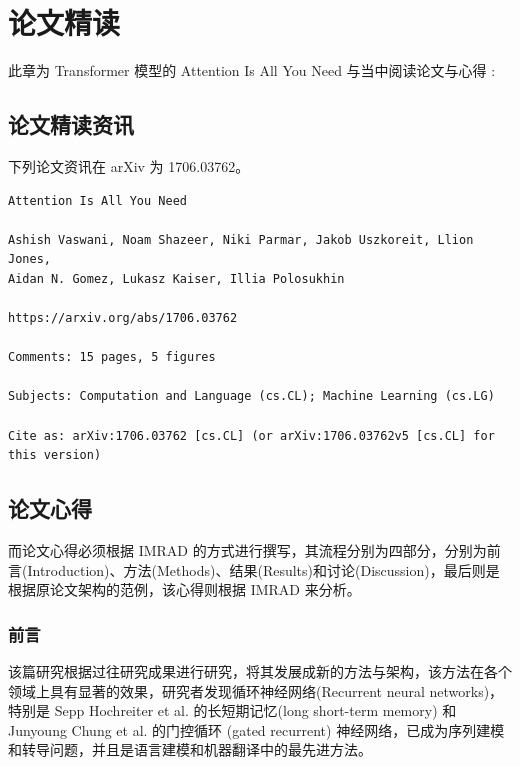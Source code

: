 \chapter{论文精读}
\label{chap:2}

此章为 Transformer 模型的 Attention Is All You Need \cite{vaswani2017attention} 与当中阅读论文与心得 :

\section{论文精读资讯}

下列论文资讯在 arXiv 为 1706.03762。

\begin{Verbatim}
Attention Is All You Need

Ashish Vaswani, Noam Shazeer, Niki Parmar, Jakob Uszkoreit, Llion Jones, 
Aidan N. Gomez, Lukasz Kaiser, Illia Polosukhin

https://arxiv.org/abs/1706.03762

Comments: 15 pages, 5 figures

Subjects: Computation and Language (cs.CL); Machine Learning (cs.LG)

Cite as: arXiv:1706.03762 [cs.CL] (or arXiv:1706.03762v5 [cs.CL] for this version)
\end{Verbatim}

\section{论文心得}

而论文心得必须根据 IMRAD 的方式进行撰写，其流程分别为四部分，分别为前言(Introduction)、方法(Methods)、结果(Results)和讨论(Discussion)，最后则是根据原论文架构的范例，该心得则根据 IMRAD 来分析。

\subsection{前言}

该篇研究根据过往研究成果进行研究，将其发展成新的方法与架构，该方法在各个领域上具有显著的效果，研究者发现循环神经网络(Recurrent neural networks)，特别是 Sepp Hochreiter et al. 的长短期记忆(long short-term memory) 和 Junyoung Chung et al. 的门控循环 (gated recurrent) 神经网络，已成为序列建模和转导问题，并且是语言建模和机器翻译中的最先进方法。

